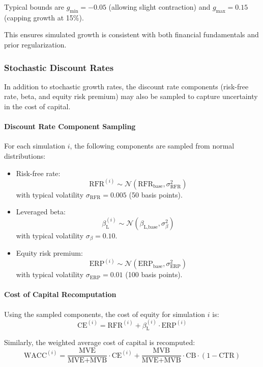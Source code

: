 Typical bounds are $g_{\min} = -0.05$ (allowing slight contraction) and $g_{\max} = 0.15$ (capping growth at 15\%).

This ensures simulated growth is consistent with both financial fundamentals and prior regularization.

\subsubsection{Stochastic Discount Rates}

In addition to stochastic growth rates, the discount rate components (risk-free rate, beta, and equity risk premium) may also be sampled to capture uncertainty in the cost of capital.

\paragraph{Discount Rate Component Sampling}

For each simulation $i$, the following components are sampled from normal distributions:

\begin{itemize}
  \item Risk-free rate:
  \[
  \text{RFR}^{(i)} \sim \mathcal{N}(\text{RFR}_{\text{base}}, \sigma_{\text{RFR}}^2)
  \]
  with typical volatility $\sigma_{\text{RFR}} = 0.005$ (50 basis points).

  \item Leveraged beta:
  \[
  \beta_{\text{L}}^{(i)} \sim \mathcal{N}(\beta_{\text{L,base}}, \sigma_{\beta}^2)
  \]
  with typical volatility $\sigma_{\beta} = 0.10$.

  \item Equity risk premium:
  \[
  \text{ERP}^{(i)} \sim \mathcal{N}(\text{ERP}_{\text{base}}, \sigma_{\text{ERP}}^2)
  \]
  with typical volatility $\sigma_{\text{ERP}} = 0.01$ (100 basis points).
\end{itemize}

\paragraph{Cost of Capital Recomputation}

Using the sampled components, the cost of equity for simulation $i$ is:
\[
\text{CE}^{(i)} = \text{RFR}^{(i)} + \beta_{\text{L}}^{(i)} \cdot \text{ERP}^{(i)}
\]

Similarly, the weighted average cost of capital is recomputed:
\[
\text{WACC}^{(i)} = \frac{\text{MVE}}{\text{MVE} + \text{MVB}} \cdot \text{CE}^{(i)} + \frac{\text{MVB}}{\text{MVE} + \text{MVB}} \cdot \text{CB} \cdot (1 - \text{CTR})
\]

